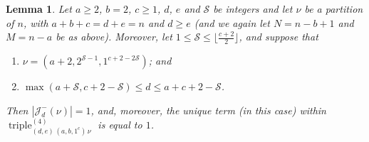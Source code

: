 \documentclass[10pt,a4paper]{amsart}
\newtheorem{lemma}{Lemma}
\begin{document}
\begin{lemma}\label{Lemsize1}
 Let $a \geq 2$, $b = 2$, $c \geq 1$, $d$, $e$ and $\mathcal{S}$ be integers and let $\nu$ be a partition of $n$, with $a+b+c = d + e = 
 n$ and $d \geq e$ (and we again let $N = n - b + 1$ and $M = n - a$ be as above). Moreover, let $1 \leq \mathcal{S} \leq \lfloor 
 \frac{c+2}{2} \rfloor$, and suppose that 
\begin{enumerate}

\item $\nu = (a+2, 2^{\mathcal{S}-1}, 1^{c+2-2\mathcal{S}})$; and 

\item $\max(a + \mathcal{S}, c + 2 - \mathcal{S}) \leq d \leq a + c + 2 -\mathcal{S}$.

\end{enumerate}

\noindent Then $\left| \mathcal{J}_{d}^{-}(\nu) \right| = 1$, and, moreover, the unique term (in this case) within
 $ \operatorname{triple}_{(d, e) \, (a, b, 1^c) \, \nu}^{(4)}$ is equal to $1$. 
\end{lemma}
\end{document}
